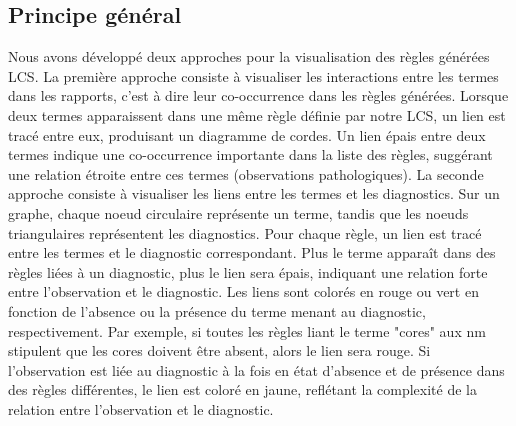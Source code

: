 \subsection{Principe général}
Nous avons développé deux approches pour la visualisation des règles générées LCS.
La première approche consiste à visualiser les interactions entre les termes dans les rapports, c'est à dire leur co-occurrence dans les règles générées. Lorsque deux termes apparaissent dans une même règle définie par notre LCS, un lien est tracé entre eux, produisant un diagramme de cordes. Un lien épais entre deux termes indique une co-occurrence importante dans la liste des règles, suggérant une relation étroite entre ces termes (observations pathologiques).
La seconde approche consiste à visualiser les liens entre les termes et les diagnostics. Sur un graphe, chaque noeud circulaire représente un terme, tandis que les noeuds triangulaires représentent les diagnostics. Pour chaque règle, un lien est tracé entre les termes et le diagnostic correspondant. Plus le terme apparaît dans des règles liées à un diagnostic, plus le lien sera épais, indiquant une relation forte entre l'observation et le diagnostic. Les liens sont colorés en rouge ou vert en fonction de l'absence ou la présence du terme menant au diagnostic, respectivement. Par exemple, si toutes les règles liant le terme "cores" aux \gls{nm} stipulent que les cores doivent être absent, alors le lien sera rouge. Si l'observation est liée au diagnostic à la fois en état d'absence et de présence dans des règles différentes, le lien est coloré en jaune, reflétant la complexité de la relation entre l'observation et le diagnostic.
